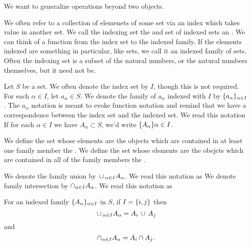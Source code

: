 
\sbasic





\sstart



We want to generalize operations beyond two objects.


We often refer to a collection of elemenets of some set via an index which takes value in another set.
We call the indexing set the  and set of indexed sets an .
We can think of a function from the index set to the indexed family.
If the elements indexed are something in particular, like sets, we call it an indexed family of sets.
Often the indexing set is a subset of the natural numbers, or the natural numbers themselves, but it need not be.

Let $S$ be a set.
We often denote the index set by $I$, though this is not required.
For each $\alpha \in I$, let $a_{\alpha} \in S$.
We denote the family of $a_{\alpha}$ indexed with $I$ by $\{a_{\alpha}\}_{\alpha \in I}$.
The $a_{\alpha}$ notation is meant to evoke function notation and remind that we have a correspondence between the index set and the indexed set.
We read this notation 
If for each $\alpha \in I$ we have $A_{\alpha} \subset S$, we'd write $\{A_{\alpha}\}{\alpha \in I}$.


We define the set whose elements are the objects which are contained in at least one family member the .
We define the set whose elements are the obejcts which are contained in all of the family members the .


We denote the family union by $\,\cup\,_{\alpha \in I} A_{\alpha}$.
We read this notation as 
We denote family intersection by $\cap_{\alpha \in I} A_{\alpha}$.
We read this notation as 


\begin{prop}
  For an indexed family $\{A_{\alpha}\}_{\alpha \in I}$ in $S$, if $I = \{i, j\}$ then
  \[
    \,\cup\,_{\alpha \in I} A_{\alpha} = A_i \,\cup\, A_j
  \]
  and
  \[
    \cap_{\alpha \in I} A_{\alpha} = A_i \cap A_j.
  \]
\end{prop}


